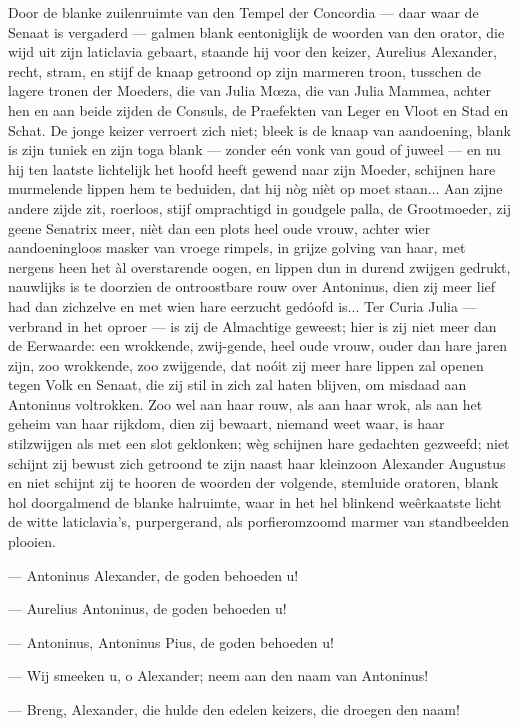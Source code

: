 \documentclass[a4paper, 12pt, oneside, dutch]{article}
\begin{document}
Door de blanke zuilenruimte van den Tempel der Concordia --- daar waar de Senaat is vergaderd --- galmen blank eentoniglijk de woorden van den orator, die wijd uit zijn laticlavia gebaart, staande hij voor den keizer, Aurelius Alexander, recht, stram, en stijf de knaap getroond op zijn marmeren troon, tusschen de lagere tronen der Moeders, die van Julia Mœza, die van Julia Mammea, achter hen en aan beide zijden de Consuls, de Praefekten van Leger en Vloot en Stad en Schat. De jonge keizer verroert zich niet; bleek is de knaap van aandoening, blank is zijn tuniek en zijn toga blank --- zonder eén vonk van goud of juweel --- en nu hij ten laatste lichtelijk het hoofd heeft gewend naar zijn Moeder, schijnen hare murmelende lippen hem te beduiden, dat hij nòg nièt op moet staan... Aan zijne andere zijde zit, roerloos, stijf omprachtigd in goudgele palla, de Grootmoeder, zij geene Senatrix meer, nièt dan een plots heel oude vrouw, achter wier aandoeningloos masker van vroege rimpels, in grijze golving van haar, met nergens heen het àl overstarende oogen, en lippen dun in durend zwijgen gedrukt, nauwlijks is te doorzien de ontroostbare rouw over Antoninus, dien zij meer lief had dan zichzelve en met wien hare eerzucht gedóofd is... Ter Curia Julia --- verbrand in het oproer --- is zij de Almachtige geweest; hier is zij niet meer dan de Eerwaarde: een wrokkende, zwij-gende, heel oude vrouw, ouder dan hare jaren zijn, zoo wrokkende, zoo zwijgende, dat noóit zij meer hare lippen zal openen tegen Volk en Senaat, die zij stil in zich zal haten blijven, om misdaad aan Antoninus voltrokken. Zoo wel aan haar rouw, als aan haar wrok, als aan het geheim van haar rijkdom, dien zij bewaart, niemand weet waar, is haar stilzwijgen als met een slot geklonken; wèg schijnen hare gedachten gezweefd; niet schijnt zij bewust zich getroond te zijn naast haar kleinzoon Alexander Augustus en niet schijnt zij te hooren de woorden der volgende, stemluide oratoren, blank hol doorgalmend de blanke halruimte, waar in het hel blinkend weêrkaatste licht de witte laticlavia's, purpergerand, als porfieromzoomd marmer van standbeelden plooien.

--- Antoninus Alexander, de goden behoeden u!

--- Aurelius Antoninus, de goden behoeden u!

--- Antoninus, Antoninus Pius, de goden behoeden u!

--- Wij smeeken u, o Alexander; neem aan den naam van Antoninus!

--- Breng, Alexander, die hulde den edelen keizers, die droegen den naam!
\end{document}
